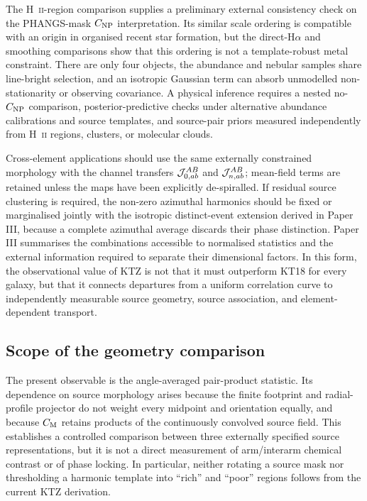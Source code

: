 \documentclass[fleqn,usenatbib]{mnras}
\begin{document}
The H~\textsc{ii}-region comparison supplies a preliminary external consistency check on the PHANGS-mask $C_{\rm NP}$ interpretation.  Its similar scale ordering is compatible with an origin in organised recent star formation, but the direct-H$\alpha$ and smoothing comparisons show that this ordering is not a template-robust metal constraint.  There are only four objects, the abundance and nebular samples share line-bright selection, and an isotropic Gaussian term can absorb unmodelled non-stationarity or observing covariance.  A physical inference requires a nested no-$C_{\rm NP}$ comparison, posterior-predictive checks under alternative abundance calibrations and source templates, and source-pair priors measured independently from H~\textsc{ii} regions, clusters, or molecular clouds.

Cross-element applications should use the same externally constrained morphology with the channel transfers ${\cal J}_{0,ab}^{AB}$ and ${\cal J}_{n,ab}^{AB}$; mean-field terms are retained unless the maps have been explicitly de-spiralled.  If residual source clustering is required, the non-zero azimuthal harmonics should be fixed or marginalised jointly with the isotropic distinct-event extension derived in Paper III, because a complete azimuthal average discards their phase distinction.  Paper III summarises the combinations accessible to normalised statistics and the external information required to separate their dimensional factors.  In this form, the observational value of KTZ is not that it must outperform KT18 for every galaxy, but that it connects departures from a uniform correlation curve to independently measurable source geometry, source association, and element-dependent transport.

\subsection{Scope of the geometry comparison}
\label{ssec:geometry_scope}

The present observable is the angle-averaged pair-product statistic.  Its dependence on source morphology arises because the finite footprint and radial-profile projector do not weight every midpoint and orientation equally, and because $C_{\rm M}$ retains products of the continuously convolved source field.  This establishes a controlled comparison between three externally specified source representations, but it is not a direct measurement of arm/interarm chemical contrast or of phase locking.  In particular, neither rotating a source mask nor thresholding a harmonic template into ``rich'' and ``poor'' regions follows from the current KTZ derivation.
\end{document}
